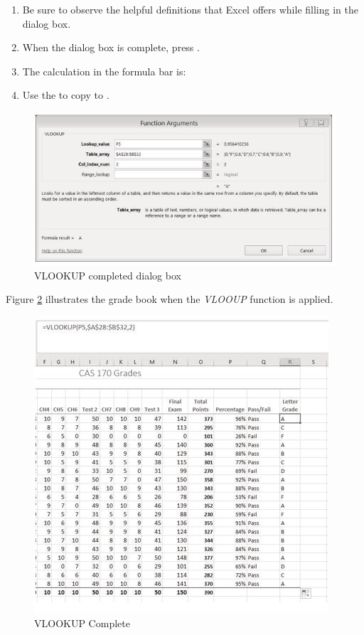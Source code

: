 \begin{enumbox}
\begin{enumerate}
		\item Be sure to observe the helpful definitions that Excel offers while filling in the  dialog box.
		\item When the dialog box is complete, press .
		\item The calculation in the formula bar is: 
		\item Use the  to copy  to .
	\end{enumerate}
\end{enumbox}
	
\begin{figure}[H]
	\centering
	\includegraphics[width=\maxwidth{.95\linewidth}]{gfx/ch03_fig13}
	\caption{VLOOKUP completed dialog box}
	\label{03:fig13}
\end{figure}

Figure \ref{03:fig14} illustrates the grade book when the \textit{VLOOUP} function is applied.

\begin{figure}[H]
	\centering
	\includegraphics[width=\maxwidth{.95\linewidth}]{gfx/ch03_fig14}
	\caption{VLOOKUP Complete}
	\label{03:fig14}
\end{figure}

